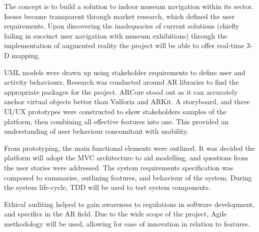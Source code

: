 
{
The concept is to build a solution to indoor museum navigation within its sector. Issues became transparent through market research, which defined the user requirements. Upon discovering the inadequacies of current solutions (chiefly failing in succinct user navigation with museum exhibitions) through the implementation of augmented reality the project will be able to offer real-time 3-D mapping.

UML models were drawn up using stakeholder requirements to define user and activity behaviours. Research was conducted around AR libraries to find the appropriate packages for the project. ARCore stood out as it can accurately anchor virtual objects better than Vulforia and ARKit. A storyboard, and three UI/UX prototypes were constructed to show stakeholders samples of the platform, then combining all effective features into one. This provided an understanding of user behaviour concomitant with usability.

From prototyping, the main functional elements were outlined. It was decided the platform will adopt the MVC architecture to aid modelling, and questions from the user stories were addressed. The system requirements specification was composed to summarise, outlining features, and behaviour of the system. During the system life-cycle, TDD will be used to test system components.

Ethical auditing helped to gain awareness to regulations in software development, and specifics in the AR field. Due to the wide scope of the project, Agile methodology will be used, allowing for ease of innovation in relation to features.

}
